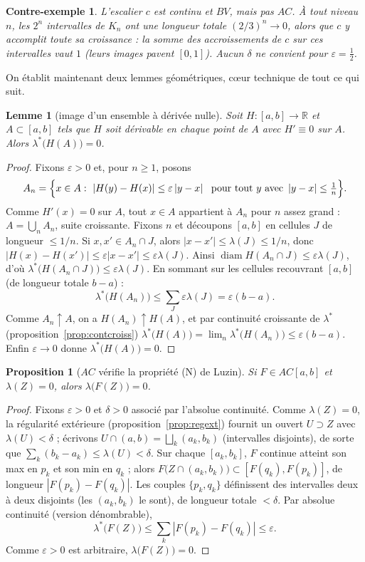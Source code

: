 \documentclass[11pt]{article}
\theoremstyle{thmblue}
\newtheorem{proposition}[theoreme]{Proposition}
\newtheorem{lemme}[theoreme]{Lemme}
\theoremstyle{defplain}
\newtheorem{contreexemple}[theoreme]{Contre-exemple}
\theoremstyle{rem}
\newcommand{\R}{\mathbb{R}}
\DeclareMathOperator{\diam}{diam}
\newcommand{\abs}[1]{\left\lvert #1 \right\rvert}
\newcommand{\eps}{\varepsilon}
\newcommand{\lstar}{\lambda^{\!*}}
\begin{document}
\begin{contreexemple}\label{ce:cantor-nonac}
L'escalier $c$ est continu et $BV$, mais \emph{pas} $AC$. À tout niveau $n$, les $2^n$ intervalles de
$K_n$ ont une longueur totale $(2/3)^n\to0$, alors que $c$ y accomplit \emph{toute} sa croissance : la
somme des accroissements de $c$ sur ces intervalles vaut $1$ (leurs images pavent $[0,1]$). Aucun
$\delta$ ne convient pour $\eps=\tfrac12$.
\end{contreexemple}

On établit maintenant deux lemmes géométriques, cœur technique de tout ce qui suit.

\begin{lemme}[image d'un ensemble à dérivée nulle]\label{lem:image}
Soit $H:[a,b]\to\R$ et $A\subset[a,b]$ tels que $H$ soit dérivable en chaque point de $A$ avec
$H'\equiv0$ sur $A$. Alors $\lstar\bigl(H(A)\bigr)=0$.
\end{lemme}

\begin{proof}
Fixons $\eps>0$ et, pour $n\ge1$, posons
\[
A_n=\Bigl\{x\in A:\ \abs{H(y)-H(x)}\le\eps\abs{y-x}\ \text{ pour tout }y\text{ avec }\abs{y-x}\le\tfrac1n\Bigr\}.
\]
Comme $H'(x)=0$ sur $A$, tout $x\in A$ appartient à $A_n$ pour $n$ assez grand : $A=\bigcup_n A_n$,
suite croissante. Fixons $n$ et découpons $[a,b]$ en cellules $J$ de longueur $\le1/n$. Si
$x,x'\in A_n\cap J$, alors $\abs{x-x'}\le\lambda(J)\le1/n$, donc $\abs{H(x)-H(x')}\le\eps\abs{x-x'}\le
\eps\lambda(J)$. Ainsi $\diam H(A_n\cap J)\le\eps\lambda(J)$, d'où $\lstar\bigl(H(A_n\cap J)\bigr)\le
\eps\lambda(J)$. En sommant sur les cellules recouvrant $[a,b]$ (de longueur totale $b-a$) :
\[
\lstar\bigl(H(A_n)\bigr)\le\sum_J\eps\lambda(J)=\eps(b-a).
\]
Comme $A_n\uparrow A$, on a $H(A_n)\uparrow H(A)$, et par continuité croissante de $\lstar$ (proposition~\ref{prop:contcroiss})
$\lstar\bigl(H(A)\bigr)=\lim_n\lstar\bigl(H(A_n)\bigr)\le\eps(b-a)$. Enfin $\eps\to0$ donne
$\lstar\bigl(H(A)\bigr)=0$.
\end{proof}

\begin{proposition}[$AC$ vérifie la propriété (N) de Luzin]\label{prop:luzin}
Si $F\in AC[a,b]$ et $\lambda(Z)=0$, alors $\lambda\bigl(F(Z)\bigr)=0$.
\end{proposition}

\begin{proof}
Fixons $\eps>0$ et $\delta>0$ associé par l'absolue continuité. Comme $\lambda(Z)=0$, la régularité
extérieure (proposition~\ref{prop:regext}) fournit un ouvert $U\supset Z$ avec $\lambda(U)<\delta$ ;
écrivons $U\cap(a,b)=\bigsqcup_k(a_k,b_k)$ (intervalles
disjoints), de sorte que $\sum_k(b_k-a_k)\le\lambda(U)<\delta$. Sur chaque $[a_k,b_k]$, $F$ continue
atteint son max en $p_k$ et son min en $q_k$ ; alors $F\bigl(Z\cap(a_k,b_k)\bigr)\subset[F(q_k),F(p_k)]$,
de longueur $\abs{F(p_k)-F(q_k)}$. Les couples $\{p_k,q_k\}$ définissent des intervalles deux à deux
disjoints (les $(a_k,b_k)$ le sont), de longueur totale $<\delta$. Par absolue continuité (version
dénombrable),
\[
\lstar\bigl(F(Z)\bigr)\le\sum_k\abs{F(p_k)-F(q_k)}\le\eps.
\]
Comme $\eps>0$ est arbitraire, $\lambda\bigl(F(Z)\bigr)=0$.
\end{proof}
\end{document}
